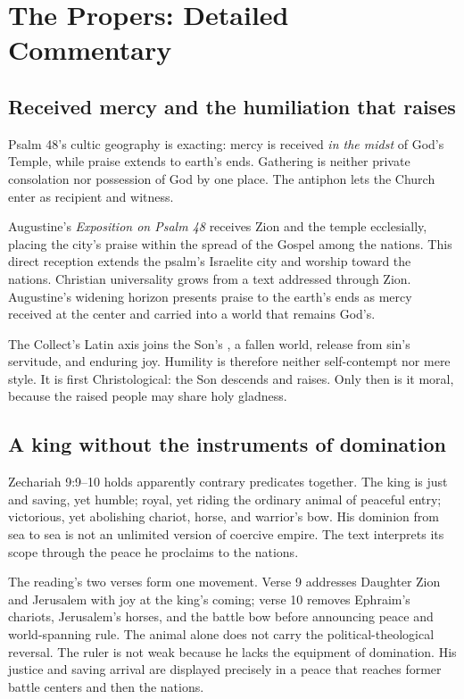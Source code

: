 \section*{The Propers: Detailed Commentary}

\subsection*{Received mercy and the humiliation that raises\enspace{}}

Psalm 48's cultic geography is exacting: mercy is received \emph{in the midst} of God's Temple, while praise extends to earth's ends. Gathering is neither private consolation nor possession of God by one place. The antiphon lets the Church enter as recipient and witness.

Augustine's \emph{Exposition on Psalm 48} receives Zion and the temple ecclesially, placing the city's praise within the spread of the Gospel among the nations. This direct reception extends the psalm's Israelite city and worship toward the nations. Christian universality grows from a text addressed through Zion. Augustine's widening horizon presents praise to the earth's ends as mercy received at the center and carried into a world that remains God's.

The Collect's Latin axis joins the Son's , a fallen world, release from sin's servitude, and enduring joy. Humility is therefore neither self-contempt nor mere style. It is first Christological: the Son descends and raises. Only then is it moral, because the raised people may share holy gladness.

\subsection*{A king without the instruments of domination\enspace{}}

Zechariah 9:9--10 holds apparently contrary predicates together. The king is just and saving, yet humble; royal, yet riding the ordinary animal of peaceful entry; victorious, yet abolishing chariot, horse, and warrior's bow. His dominion from sea to sea is not an unlimited version of coercive empire. The text interprets its scope through the peace he proclaims to the nations.

The reading's two verses form one movement. Verse 9 addresses Daughter Zion and Jerusalem with joy at the king's coming; verse 10 removes Ephraim's chariots, Jerusalem's horses, and the battle bow before announcing peace and world-spanning rule. The animal alone does not carry the political-theological reversal. The ruler is not weak because he lacks the equipment of domination. His justice and saving arrival are displayed precisely in a peace that reaches former battle centers and then the nations.

